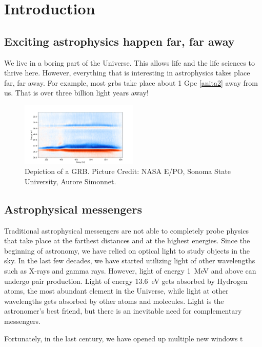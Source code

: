 \chapter{Introduction}

\section{Exciting astrophysics happen far, far away}

We live in a boring part of the Universe. This allows life and the life sciences to thrive here. However, everything that is interesting in astrophysics takes place far, far away. For example, most \gls{grbs} take place about 1 Gpc \ref{anita2} away from us. That is over three billion light years away! 



\begin{figure}
\centering
\includegraphics[width=0.5\textwidth]{figures/Introduction/6_forthesis.png}
\caption{Depiction of a GRB. Picture Credit: NASA E/PO, Sonoma State University, Aurore Simonnet.}
\label{grb}
\end{figure}

\section{Astrophysical messengers}

Traditional astrophysical messengers are not able to completely probe physics that take place at the farthest distances and at the highest energies. Since the beginning of astronomy, we have relied on optical light to study objects in the sky. In the last few decades, we have started utilizing light of other wavelengths such as X-rays and gamma rays. However, light of energy 1~MeV and above can undergo pair production. Light of energy 13.6~eV gets absorbed by Hydrogen atoms, the most abundant element in the Universe, while light at other wavelengths gets absorbed by other atoms and molecules. Light is the astronomer's best friend, but there is an inevitable need for complementary messengers.

Fortunately, in the last century, we have opened up multiple new windows t

